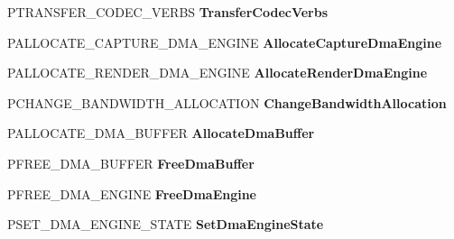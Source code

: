 \begin{DoxyCompactItemize}
P\+T\+R\+A\+N\+S\+F\+E\+R\+\_\+\+C\+O\+D\+E\+C\+\_\+\+V\+E\+R\+BS {\bfseries Transfer\+Codec\+Verbs}
\item 
\mbox{\label{struct___h_d_a_u_d_i_o___b_u_s___i_n_t_e_r_f_a_c_e___v2_a09d50f13b79b27e1e9139e9651880448}} 
P\+A\+L\+L\+O\+C\+A\+T\+E\+\_\+\+C\+A\+P\+T\+U\+R\+E\+\_\+\+D\+M\+A\+\_\+\+E\+N\+G\+I\+NE {\bfseries Allocate\+Capture\+Dma\+Engine}
\item 
\mbox{\label{struct___h_d_a_u_d_i_o___b_u_s___i_n_t_e_r_f_a_c_e___v2_aff3dc0e3180577cbe8e17371f387db47}} 
P\+A\+L\+L\+O\+C\+A\+T\+E\+\_\+\+R\+E\+N\+D\+E\+R\+\_\+\+D\+M\+A\+\_\+\+E\+N\+G\+I\+NE {\bfseries Allocate\+Render\+Dma\+Engine}
\item 
\mbox{\label{struct___h_d_a_u_d_i_o___b_u_s___i_n_t_e_r_f_a_c_e___v2_a40cb0268046cc763911dcc40e9cccc30}} 
P\+C\+H\+A\+N\+G\+E\+\_\+\+B\+A\+N\+D\+W\+I\+D\+T\+H\+\_\+\+A\+L\+L\+O\+C\+A\+T\+I\+ON {\bfseries Change\+Bandwidth\+Allocation}
\item 
\mbox{\label{struct___h_d_a_u_d_i_o___b_u_s___i_n_t_e_r_f_a_c_e___v2_adf0b02a0bd6cd52343bd28613dcc9d73}} 
P\+A\+L\+L\+O\+C\+A\+T\+E\+\_\+\+D\+M\+A\+\_\+\+B\+U\+F\+F\+ER {\bfseries Allocate\+Dma\+Buffer}
\item 
\mbox{\label{struct___h_d_a_u_d_i_o___b_u_s___i_n_t_e_r_f_a_c_e___v2_a6a807439b592ae2e86156b246d618ef6}} 
P\+F\+R\+E\+E\+\_\+\+D\+M\+A\+\_\+\+B\+U\+F\+F\+ER {\bfseries Free\+Dma\+Buffer}
\item 
\mbox{\label{struct___h_d_a_u_d_i_o___b_u_s___i_n_t_e_r_f_a_c_e___v2_a0dcdb3e4ec8a2cdfae5300479f4263b1}} 
P\+F\+R\+E\+E\+\_\+\+D\+M\+A\+\_\+\+E\+N\+G\+I\+NE {\bfseries Free\+Dma\+Engine}
\item 
\mbox{\label{struct___h_d_a_u_d_i_o___b_u_s___i_n_t_e_r_f_a_c_e___v2_aa4af8469d24d1675a0e84a41cc7904ca}} 
P\+S\+E\+T\+\_\+\+D\+M\+A\+\_\+\+E\+N\+G\+I\+N\+E\+\_\+\+S\+T\+A\+TE {\bfseries Set\+Dma\+Engine\+State}

\end{DoxyCompactItemize}

